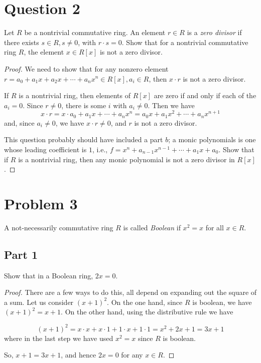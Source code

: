 \documentclass{amsart}[12pt]
\begin{document}
\section*{Question 2}
Let $R$ be a nontrivial commutative ring.  An element $r\in R$ is a \emph{zero divisor} if there exists $s\in R, s\neq 0$, with $r\cdot s=0$.  Show that for a nontrivial commutative ring $R$, the element $x\in R[x]$ is not a zero divisor.

\begin{proof}
We need to show that for any nonzero element $r=a_0+a_1x+a_2x+\cdots+a_nx^n\in R[x], a_i\in R$, then $x\cdot r$ is not a zero divisor.

If $R$ is a nontrivial ring, then elements of $R[x]$ are zero if and only if each of the $a_i=0$.  Since $r\neq 0$, there is some $i$ with $a_i\neq 0$.  Then we have 
$$x\cdot r=x\cdot a_0+a_1x+\cdots +a_nx^n=a_0x+a_1x^2+\cdots +a_nx^{n+1}$$
and, since $a_i\neq 0$, we have $x\cdot r\neq 0$, and $r$ is not a zero divisor.

This question probably should have included a part $b$; a monic polynomials is one whose leading coefficient is $1$, i.e., $f=x^n+a_{n-1}x^{n-1}+\cdots+a_1x+a_0$.  Show that if $R$ is a nontrivial ring, then any monic polynomial is not a zero divisor in $R[x]$.


\end{proof}



\section*{Problem 3}
A not-necessarily commutative ring $R$ is called \emph{Boolean} if $x^2=x$ for all $x\in R$.

\subsection*{Part 1} Show that in a Boolean ring, $2x=0$.
\begin{proof}
There are a few ways to do this, all depend on expanding out the square of a sum.  Let us consider $(x+1)^2$.  On the one hand, since $R$ is boolean, we have $(x+1)^2=x+1$.  On the other hand, using the distributive rule we have

$$(x+1)^2=x\cdot x+x\cdot 1+1\cdot x+1\cdot 1=x^2+2x+1=3x+1$$
where in the last step we have used $x^2=x$ since $R$ is boolean.

So, $x+1=3x+1$, and hence $2x=0$ for any $x\in R$.

\end{proof}
\end{document}
